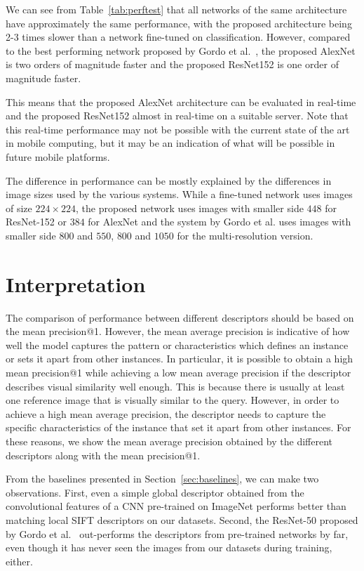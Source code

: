 We can see from Table~\ref{tab:perftest} that all networks
of the same architecture have approximately the same performance, with
the proposed architecture being 2-3 times slower than a network
fine-tuned on classification. However, compared to the best performing
network proposed by Gordo et al.~\cite{gordo_deep_2016}, the proposed AlexNet
is two orders of magnitude faster and the proposed ResNet152 is one
order of magnitude faster.

This means that the proposed AlexNet architecture can be evaluated in
real-time and the proposed ResNet152 almost in real-time on a suitable
server.
Note that this real-time performance may not be possible with the current
state of the art in mobile computing, but it may be an indication of
what will be possible in future mobile platforms.

The difference in performance can be mostly explained by the
differences in image
sizes used by the various systems. While a fine-tuned network uses
images of size $224 \times 224$, the proposed network uses images
with smaller side $448$ for ResNet-152 or $384$ for AlexNet and the
system by Gordo et al. uses images with smaller side $800$ and $550$,
$800$ and $1050$ for the multi-resolution version.

\section{Interpretation}
The comparison of performance between different descriptors should
be based on the mean precision@1. However, the mean average
precision is indicative of how well the model
captures the pattern or characteristics which defines an instance or
sets it apart from other instances. In particular, it is possible to obtain
a high mean precision@1 while achieving a low mean average precision
if the descriptor describes visual similarity well enough. This is because
there is usually at least one reference image that is visually similar
to the query. However, in order to achieve a high mean average precision,
the descriptor needs to capture the specific characteristics of the
instance that set it apart from other instances. For these reasons,
we show the mean average precision obtained by the different
descriptors along with the mean precision@1.

From the baselines presented in Section~\ref{sec:baselines}, we can make
two observations. First, even a simple global descriptor obtained from the
convolutional features of a CNN pre-trained on ImageNet performs better
than matching local SIFT descriptors on our datasets. Second, the ResNet-50
proposed by Gordo et al.~\cite{gordo_deep_2016} out-performs the descriptors
from pre-trained networks by far, even though it has never seen the images
from our datasets during training, either.

